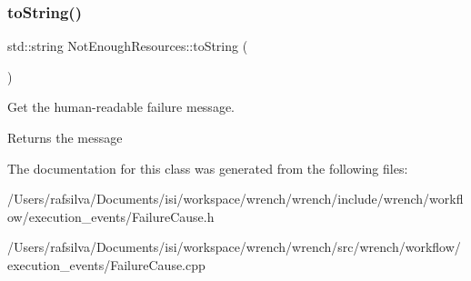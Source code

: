 \subsubsection{\texorpdfstring{to\+String()}{toString()}}
{\footnotesize\ttfamily std\+::string Not\+Enough\+Resources\+::to\+String (\begin{DoxyParamCaption}{ }\end{DoxyParamCaption})}



Get the human-\/readable failure message. 

\begin{DoxyReturn}{Returns}
the message 
\end{DoxyReturn}


The documentation for this class was generated from the following files\+:\begin{DoxyCompactItemize}
\item 
/\+Users/rafsilva/\+Documents/isi/workspace/wrench/wrench/include/wrench/workflow/execution\+\_\+events/Failure\+Cause.\+h\item 
/\+Users/rafsilva/\+Documents/isi/workspace/wrench/wrench/src/wrench/workflow/execution\+\_\+events/Failure\+Cause.\+cpp\end{DoxyCompactItemize}
